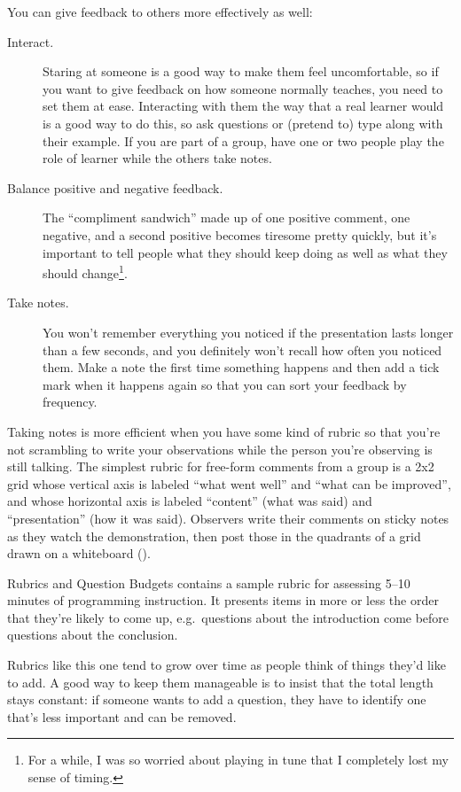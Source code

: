 \noindent
You can give feedback to others more effectively as well:

\begin{description}

\item[Interact.]
  Staring at someone is a good way to make them feel uncomfortable,
  so if you want to give feedback on how someone normally teaches,
  you need to set them at ease.
  Interacting with them the way that a real learner would is a good way to do this,
  so ask questions or (pretend to) type along with their example.
  If you are part of a group,
  have one or two people play the role of learner
  while the others take notes.

\item[Balance positive and negative feedback.]
  The ``compliment sandwich'' made up of one positive comment,
  one negative,
  and a second positive
  becomes tiresome pretty quickly,
  but it's important to tell people what they should keep doing
  as well as what they should change\footnote{
    For a while,
    I was so worried about playing in tune that I completely lost my sense of timing.
  }.

\item[Take notes.]
  You won't remember everything you noticed
  if the presentation lasts longer than a few seconds,
  and you definitely won't recall how often you noticed them.
  Make a note the first time something happens
  and then add a tick mark when it happens again
  so that you can sort your feedback by frequency.

\end{description}

Taking notes is more efficient when you have some kind of rubric
so that you're not scrambling to write your observations
while the person you're observing is still talking.
The simplest rubric for free-form comments from a group
is a 2x2 grid whose vertical axis is labeled ``what went well'' and ``what can be improved'',
and whose horizontal axis is labeled ``content'' (what was said)
and ``presentation'' (how it was said).
Observers write their comments on sticky notes as they watch the demonstration,
then post those in the quadrants of a grid drawn on a whiteboard
().


\begin{aside}{Rubrics and Question Budgets}
   contains a sample rubric
  for assessing 5--10 minutes of programming instruction.
  It presents items in more or less the order that they're likely to come up,
  e.g.\ questions about the introduction come before questions about the conclusion.

  Rubrics like this one
  tend to grow over time as people think of things they'd like to add.
  A good way to keep them manageable is to insist that
  the total length stays constant:
  if someone wants to add a question,
  they have to identify one that's less important and can be removed.
\end{aside}

